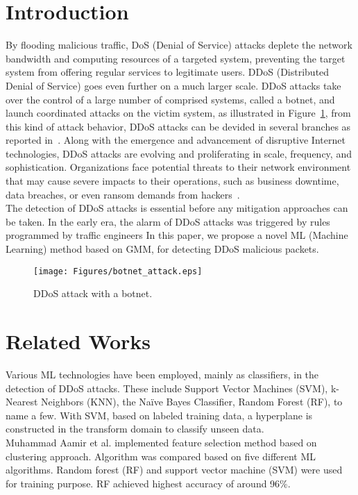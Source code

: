 \documentclass[runningheads]{llncs}
\begin{document}
%

\section{Introduction}
By flooding malicious traffic, DoS (Denial of Service) attacks deplete the network
bandwidth and computing resources of a targeted system, preventing the target system
from offering regular services to legitimate users. DDoS (Distributed Denial of Service)
goes even further on a much larger scale. DDoS attacks take over the control of a large
number of comprised systems, called a botnet, and launch coordinated attacks on the victim
system, as illustrated in Figure~\ref{fig1}, from this kind of attack behavior, DDoS attacks
can be devided in several branches as reported in~\cite{ref_paper1}. 
Along with the emergence and advancement of disruptive
Internet technologies, DDoS attacks are evolving and proliferating in scale, frequency, and
sophistication. Organizations face potential threats to their network environment that may
cause severe impacts to their operations, such as business downtime, data breaches, or
even ransom demands from hackers~\cite{ref_url1}.\\
The detection of DDoS attacks is essential before any mitigation approaches can be taken. 
In the early era, the alarm of DDoS attacks was triggered by rules programmed by traffic engineers
In this paper, we propose a novel ML (Machine Learning) method based on GMM, for detecting DDoS
malicious packets.

\begin{figure}[h]
    \centering
    \texttt{[image: Figures/botnet\_attack.eps]}
    \caption{DDoS attack with a botnet.}
    \label{fig1}
\end{figure}

\clearpage

\section{Related Works} %
Various ML technologies have been employed, mainly as classifiers, in the detection
of DDoS attacks. These include Support Vector Machines (SVM), k-Nearest Neighbors
(KNN), the Naïve Bayes Classifier, Random Forest (RF), to name a
few. With SVM, based on labeled training data, a hyperplane is constructed in the transform
domain to classify unseen data.\\
Muhammad Aamir et al. \cite{ref_paper3} implemented feature selection method based on clustering approach. Algorithm was compared 
based on five different ML algorithms. Random forest (RF) and support vector machine (SVM) 
were used for training purpose. RF achieved highest accuracy of around 96\%.
\end{document}
